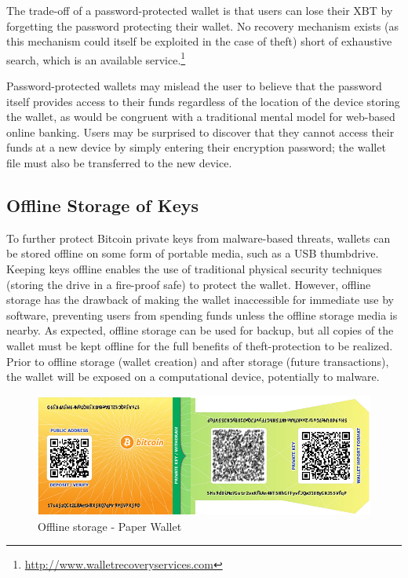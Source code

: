 The trade-off of a password-protected wallet is that users can lose their XBT by forgetting the password protecting their wallet. No recovery mechanism exists (as this mechanism could itself be exploited in the case of theft) short of exhaustive search, which is an available service.\footnote{\url{http://www.walletrecoveryservices.com}}

Password-protected wallets may mislead the user to believe that the password itself provides access to their funds regardless of the location of the device storing the wallet, as would be congruent with a traditional mental model for web-based online banking. Users may be surprised to discover that they cannot access their funds at a new device by simply entering their encryption password; the wallet file must also be transferred to the new device. 

\subsection{Offline Storage of Keys}
\label{sec:offline storage}
To further protect Bitcoin private keys from malware-based threats, wallets can be stored offline on some form of portable media, such as a USB thumbdrive. Keeping keys offline enables the use of traditional physical security techniques (\eg storing the drive in a fire-proof safe) to protect the wallet. However, offline storage has the drawback of making the wallet inaccessible for immediate use by software, preventing users from spending funds unless the offline storage media is nearby. As expected, offline storage can be used for backup, but all copies of the wallet must be kept offline for the full benefits of theft-protection to be realized. Prior to offline storage (wallet creation) and after storage (future transactions), the wallet will be exposed on a computational device, potentially to malware. 

\begin{figure}[htb]
  \includegraphics[width=\linewidth]{fig/paperwallet.png}
  \caption{Offline storage - Paper Wallet} 
 \label{fig:paperwallet}
\end{figure}

